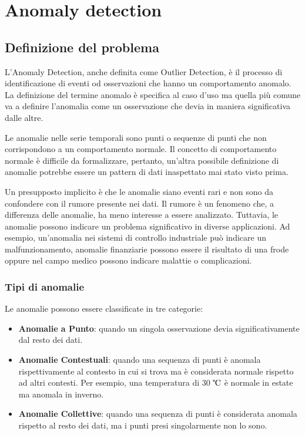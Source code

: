 \chapter{Anomaly detection}
\label{chap:intro}

\section{Definizione del problema}

L'Anomaly Detection, anche definita come Outlier Detection, è il processo di identificazione di eventi od osservazioni che hanno un comportamento anomalo. 
La definizione del termine anomalo è specifica al caso d'uso ma quella più comune va a definire l'anomalia come un osservazione che devia in maniera significativa dalle altre.

Le anomalie nelle serie temporali sono punti o sequenze di punti che non corrispondono a un comportamento normale. Il concetto di comportamento normale è difficile da formalizzare, pertanto, un'altra possibile definizione di anomalie potrebbe essere un pattern di dati inaspettato mai stato visto prima.

Un presupposto implicito è che le anomalie siano eventi rari e non sono da confondere con il rumore presente nei dati. Il rumore è un fenomeno che, a differenza delle anomalie, ha meno interesse a essere analizzato.
Tuttavia, le anomalie possono indicare un problema significativo in diverse applicazioni. Ad esempio, un'anomalia nei sistemi di controllo industriale può indicare un malfunzionamento, anomalie finanziarie possono essere il risultato di una frode oppure nel campo medico possono indicare malattie o complicazioni.

\subsection{Tipi di anomalie}
Le anomalie possono essere classificate in tre categorie:
\begin{itemize}
	\item \textbf{Anomalie a Punto}: quando un singola osservazione devia significativamente dal resto dei dati.
	\item \textbf{Anomalie Contestuali}: quando una sequenza di punti è anomala rispettivamente al contesto in cui si trova ma è considerata normale rispetto ad altri contesti. Per esempio, una temperatura di 30 $\tccentigrade$ è normale in estate ma anomala in inverno. 
	\item \textbf{Anomalie Collettive}: quando una sequenza di punti è considerata anomala rispetto al resto dei dati, ma i punti presi singolarmente non lo sono.
\end{itemize}


